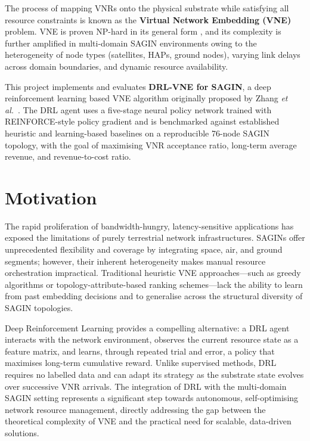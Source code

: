 \documentclass[12pt,a4paper]{report}
\begin{document}
The process of mapping VNRs onto the physical substrate while satisfying all resource
constraints is known as the \textbf{Virtual Network Embedding (VNE)} problem. VNE is proven
NP-hard in its general form \cite{even1975complexity}, and its complexity is further amplified
in multi-domain SAGIN environments owing to the heterogeneity of node types (satellites, HAPs,
ground nodes), varying link delays across domain boundaries, and dynamic resource availability.

This project implements and evaluates \textbf{DRL-VNE for SAGIN}, a deep reinforcement
learning based VNE algorithm originally proposed by Zhang \textit{et al.}\ \cite{zhang2022drl}.
The DRL agent uses a five-stage neural policy network trained with REINFORCE-style policy
gradient and is benchmarked against established heuristic and learning-based baselines on a
reproducible 76-node SAGIN topology, with the goal of maximising VNR acceptance ratio,
long-term average revenue, and revenue-to-cost ratio.

\section{Motivation}

The rapid proliferation of bandwidth-hungry, latency-sensitive applications has exposed the
limitations of purely terrestrial network infrastructures. SAGINs offer unprecedented
flexibility and coverage by integrating space, air, and ground segments; however, their
inherent heterogeneity makes manual resource orchestration impractical. Traditional heuristic
VNE approaches---such as greedy algorithms or topology-attribute-based ranking schemes---lack
the ability to learn from past embedding decisions and to generalise across the structural
diversity of SAGIN topologies.

Deep Reinforcement Learning provides a compelling alternative: a DRL agent interacts with the
network environment, observes the current resource state as a feature matrix, and learns,
through repeated trial and error, a policy that maximises long-term cumulative reward. Unlike
supervised methods, DRL requires no labelled data and can adapt its strategy as the substrate
state evolves over successive VNR arrivals. The integration of DRL with the multi-domain SAGIN
setting represents a significant step towards autonomous, self-optimising network resource
management, directly addressing the gap between the theoretical complexity of VNE and the
practical need for scalable, data-driven solutions.
\end{document}
